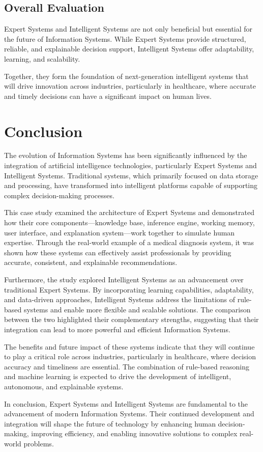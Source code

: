 \documentclass[12pt]{article}
\begin{document}
\subsection{Overall Evaluation}

Expert Systems and Intelligent Systems are not only beneficial but essential for the future of Information Systems. While Expert Systems provide structured, reliable, and explainable decision support, Intelligent Systems offer adaptability, learning, and scalability.

Together, they form the foundation of next-generation intelligent systems that will drive innovation across industries, particularly in healthcare, where accurate and timely decisions can have a significant impact on human lives.


\newpage
\section{Conclusion}

The evolution of Information Systems has been significantly influenced by the integration of artificial intelligence technologies, particularly Expert Systems and Intelligent Systems. Traditional systems, which primarily focused on data storage and processing, have transformed into intelligent platforms capable of supporting complex decision-making processes.

This case study examined the architecture of Expert Systems and demonstrated how their core components—knowledge base, inference engine, working memory, user interface, and explanation system—work together to simulate human expertise. Through the real-world example of a medical diagnosis system, it was shown how these systems can effectively assist professionals by providing accurate, consistent, and explainable recommendations.

Furthermore, the study explored Intelligent Systems as an advancement over traditional Expert Systems. By incorporating learning capabilities, adaptability, and data-driven approaches, Intelligent Systems address the limitations of rule-based systems and enable more flexible and scalable solutions. The comparison between the two highlighted their complementary strengths, suggesting that their integration can lead to more powerful and efficient Information Systems.

The benefits and future impact of these systems indicate that they will continue to play a critical role across industries, particularly in healthcare, where decision accuracy and timeliness are essential. The combination of rule-based reasoning and machine learning is expected to drive the development of intelligent, autonomous, and explainable systems.

In conclusion, Expert Systems and Intelligent Systems are fundamental to the advancement of modern Information Systems. Their continued development and integration will shape the future of technology by enhancing human decision-making, improving efficiency, and enabling innovative solutions to complex real-world problems.
\end{document}
